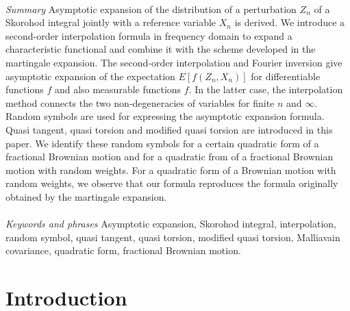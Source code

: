 \documentclass[a4paper]{article}
\numberwithin{equation}{section}
\begin{document}
\date{%
December 30, 2017
}
\maketitle
\ \\
{\it Summary} 
Asymptotic expansion of the distribution of a perturbation $Z_n$ of a Skorohod integral 
jointly with a reference variable $X_n$ is derived. 
We introduce a second-order interpolation formula in frequency domain 
to expand a characteristic functional and combine it with the scheme developed in the martingale expansion. 
The second-order interpolation and Fourier inversion give asymptotic expansion of the expectation 
$E[f(Z_n,X_n)]$ for differentiable functions $f$ and also measurable functions $f$. 
In the latter case, the interpolation method connects the two non-degeneracies of variables 
for finite $n$ and $\infty$. 
Random symbols are used for expressing the asymptotic expansion formula. 
Quasi tangent, quasi torsion and modified quasi torsion are introduced in this paper. 
We identify these random symbols for a certain quadratic form of a fractional Brownian motion and 
for a quadratic from of a fractional Brownian motion with random weights. 
For a quadratic form of a Brownian motion with random weights, 
we observe that our formula reproduces the formula originally obtained by the martingale expansion. \ \\
\ \\
{\it Keywords and phrases} 
Asymptotic expansion, Skorohod integral, interpolation, random symbol, 
quasi tangent, quasi torsion, modified quasi torsion, Malliavain covariance, 
quadratic form, fractional Brownian motion.
\ \\



\section{Introduction}
\end{document}

